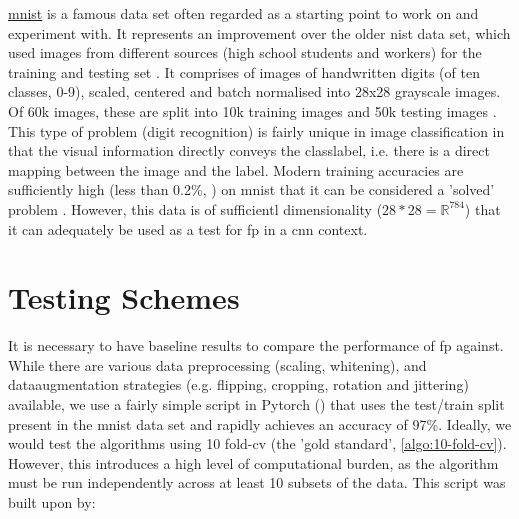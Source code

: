 \href{http://yann.lecun.com/exdb/mnist/}{\gls{mnist}} is a famous data set often regarded as a starting point to work on and experiment with. It represents an improvement over the older \gls{nist} data set, which used images from different sources (high school students and workers) for the training and testing set \cite{nist}. It comprises of images of handwritten digits (of ten classes, 0-9), scaled, centered and batch normalised into 28x28 grayscale images. Of 60k images, these are split into 10k training images and 50k testing images \cite{mnist}. This type of problem (digit recognition) is fairly unique in image classification in that the visual information directly conveys the \gls{classlabel}, i.e. there is a direct mapping between the image and the label. Modern training accuracies are sufficiently high (less than 0.2\%, \cite{mnist_sota}) on \gls{mnist} that it can be considered a 'solved' problem \cite{mnist_sota_web}. However, this data is of sufficientl dimensionality ($28 * 28 = \mathds{R}^{784}$) that it can adequately be used as a test for \gls{fp} in a \gls{cnn} context. 
 \bigskip

%

%

\section{Testing Schemes}
  
It is necessary to have baseline results to compare the performance of \gls{fp} against. While there are various data preprocessing (scaling, whitening), and \gls{dataaugmentation} strategies (e.g. flipping, cropping, rotation and jittering)  available, we use a fairly simple script in Pytorch (\cite{mnist_script}) that uses the test/train split present in the  \gls{mnist} data set and rapidly achieves an accuracy of 97\%. Ideally, we would test the algorithms using 10 fold-\gls{cv} (the 'gold standard', \ref{algo:10-fold-cv}). However, this introduces a high level of computational burden, as the algorithm must be run independently across at least 10 subsets of the data. This script was built upon by:

